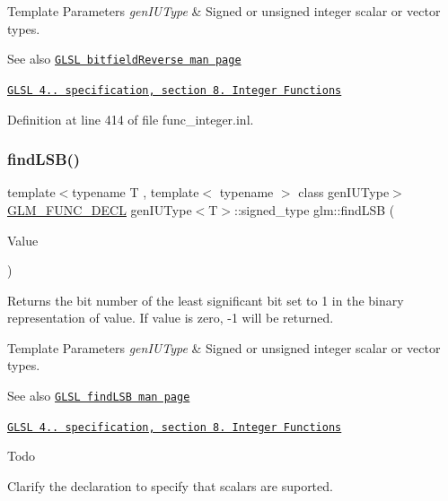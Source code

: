 \begin{DoxyTemplParams}{Template Parameters}
{\em gen\+I\+U\+Type} & Signed or unsigned integer scalar or vector types.\\
\hline
\end{DoxyTemplParams}
\begin{DoxySeeAlso}{See also}
\href{http://www.opengl.org/sdk/docs/manglsl/xhtml/bitfieldReverse.xml}{\tt G\+L\+SL bitfield\+Reverse man page} 

\href{http://www.opengl.org/registry/doc/GLSLangSpec.4.20.8.pdf}{\tt G\+L\+SL 4.. specification, section 8. Integer Functions} 
\end{DoxySeeAlso}


Definition at line 414 of file func\+\_\+integer.\+inl.

\mbox{\label{group__core__func__integer_ga43d5d9ec05ba4c46035c764ad5fd3135}} 
\subsubsection{\texorpdfstring{find\+L\+S\+B()}{findLSB()}}
{\footnotesize\ttfamily template$<$typename T , template$<$ typename $>$ class gen\+I\+U\+Type$>$ \\
\hyperlink{setup_8hpp_ab2d052de21a70539923e9bcbf6e83a51}{G\+L\+M\+\_\+\+F\+U\+N\+C\+\_\+\+D\+E\+CL} gen\+I\+U\+Type$<$T$>$\+::signed\+\_\+type glm\+::find\+L\+SB (\begin{DoxyParamCaption}\item[{gen\+I\+U\+Type$<$ T $>$ const \&}]{Value }\end{DoxyParamCaption})}

Returns the bit number of the least significant bit set to 1 in the binary representation of value. If value is zero, -\/1 will be returned.


\begin{DoxyTemplParams}{Template Parameters}
{\em gen\+I\+U\+Type} & Signed or unsigned integer scalar or vector types.\\
\hline
\end{DoxyTemplParams}
\begin{DoxySeeAlso}{See also}
\href{http://www.opengl.org/sdk/docs/manglsl/xhtml/findLSB.xml}{\tt G\+L\+SL find\+L\+SB man page} 

\href{http://www.opengl.org/registry/doc/GLSLangSpec.4.20.8.pdf}{\tt G\+L\+SL 4.. specification, section 8. Integer Functions}
\end{DoxySeeAlso}
\begin{DoxyRefDesc}{Todo}
\item[\hyperlink{todo__todo000002}{Todo}]Clarify the declaration to specify that scalars are suported. \end{DoxyRefDesc}
\mbox{\label{group__core__func__integer_gaee931af2eaecf61b629b33899c9d6f29}} 
